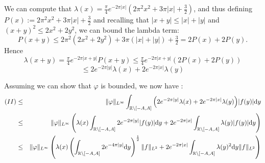 \documentclass[11pt,a4paper]{article}
\begin{document}
We can compute that $\lambda(x)=\frac{\pi}{4}e^{-2\pi \lvert x\rvert}\left(2\pi^2x^2+3\pi \lvert x\rvert +\frac{3}{2}\right)$, and thus defining $P(x):=2\pi^2x^2+3\pi|x|+\tfrac32$ and recalling that  \(|x+y|\le|x|+|y|\) and \((x+y)^2\le2x^2+2y^2\), we can bound the lambda term:
\[
P(x+y)
\le2\pi^2(2x^2+2y^2)+3\pi(|x|+|y|)+\tfrac32
=2P(x)+2P(y).
\]
Hence
\[
\lambda(x+y)
=\tfrac\pi4e^{-2\pi|x+y|}P(x+y)
\le\tfrac\pi4e^{-2\pi|x+y|}(2P(x)+2P(y))
\]
\[
\leq 2e^{-2\pi|y|}\lambda(x)+2e^{-2\pi|x|}\lambda(y)
\]


Assuming we can show that $\varphi$ is bounded, we now have :
\begin{eqnarray*}
(II) &\leq& \|\varphi\|_{L^\infty} \int_{\mathbb R \setminus [-A,A]} \Big( 2e^{-2\pi|y|}\lambda(x)+2e^{-2\pi|x|}\lambda(y)\Big)|f(y)|\mathrm{d}y \\
&\leq&  \|\varphi\|_{L^\infty} \left( \lambda(x) \int_{\mathbb R \setminus [-A,A]} 2e^{-2\pi|y|}|f(y)|\mathrm{d}y +   2e^{-2\pi|x|}\int_{\mathbb R \setminus [-A,A]} \lambda(y)|f(y)|\mathrm{d}y\right)\\
&\leq&  \|\varphi\|_{L^\infty} \left( \lambda(x) \left(\int_{\mathbb R \setminus [-A,A]} 2e^{-4\pi|y|}\mathrm{d}y\right)^\frac{1}{2} \|f\|_{L^2} +   2e^{-2\pi|x|}\int_{\mathbb R \setminus [-A,A]} \lambda(y)^2\mathrm{d}y\|f\|_{L^2}\right)\\
\end{eqnarray*}
\end{document}
